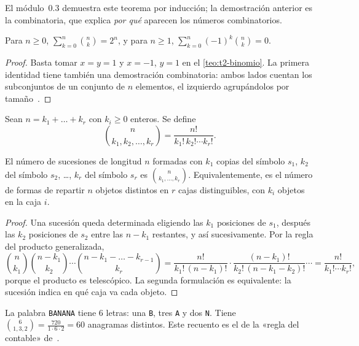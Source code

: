 El módulo~0.3 demuestra este teorema por inducción; la demostración anterior es la combinatoria, que explica \emph{por qué} aparecen los números combinatorios.

\begin{corolario}\label{cor:t2-sumas}
Para $n\ge 0$, $\sum_{k=0}^{n}\binom{n}{k}=2^{n}$, y para $n\ge1$, $\sum_{k=0}^{n}(-1)^{k}\binom{n}{k}=0$.
\end{corolario}

\begin{proof}
Basta tomar $x=y=1$ y $x=-1$, $y=1$ en el \cref{teo:t2-binomio}. La primera identidad tiene también una demostración combinatoria: ambos lados cuentan los subconjuntos de un conjunto de $n$ elementos, el izquierdo agrupándolos por tamaño~\cite[\emph{Strategic Practice}~1, problema~5]{stat110}.
\end{proof}

\begin{definicion}
Sean $n=k_1+\dots+k_r$ con $k_i\ge0$ enteros. Se define
\[
\binom{n}{k_1,k_2,\dots,k_r}=\frac{n!}{k_1!\,k_2!\cdots k_r!}.
\]
\end{definicion}

\begin{teorema}\label{teo:t2-multinomial}
El número de sucesiones de longitud $n$ formadas con $k_1$ copias del símbolo $s_1$, $k_2$ del símbolo $s_2$, \dots, $k_r$ del símbolo $s_r$ es $\binom{n}{k_1,\dots,k_r}$. Equivalentemente, es el número de formas de repartir $n$ objetos distintos en $r$ cajas distinguibles, con $k_i$ objetos en la caja $i$.
\end{teorema}

\begin{proof}
Una sucesión queda determinada eligiendo las $k_1$ posiciones de $s_1$, después las $k_2$ posiciones de $s_2$ entre las $n-k_1$ restantes, y así sucesivamente. Por la regla del producto generalizada,
\[
\binom{n}{k_1}\binom{n-k_1}{k_2}\cdots\binom{n-k_1-\dots-k_{r-1}}{k_r}
=\frac{n!}{k_1!\,(n-k_1)!}\cdot\frac{(n-k_1)!}{k_2!\,(n-k_1-k_2)!}\cdots=\frac{n!}{k_1!\cdots k_r!},
\]
porque el producto es telescópico. La segunda formulación es equivalente: la sucesión indica en qué caja va cada objeto.
\end{proof}

\begin{ejemplo}
La palabra \texttt{BANANA} tiene 6 letras: una \texttt{B}, tres \texttt{A} y dos \texttt{N}. Tiene $\binom{6}{1,3,2}=\frac{720}{1\cdot6\cdot2}=60$ anagramas distintos. Este recuento es el de la «regla del contable» de~\cite[§14.6.2]{mcs}.
\end{ejemplo}

